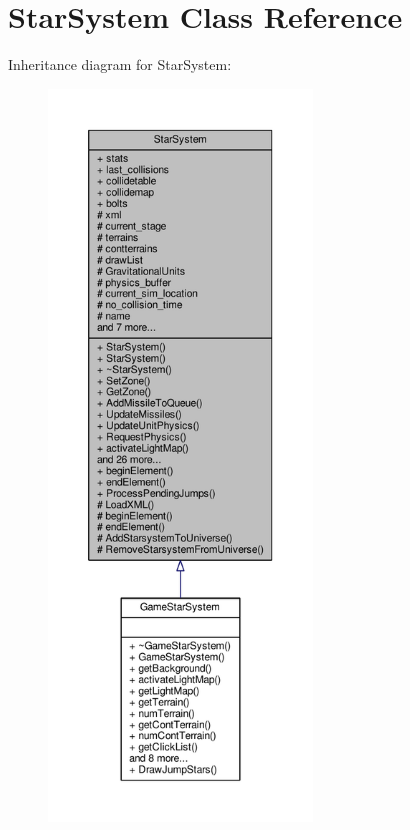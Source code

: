 \hypertarget{classStarSystem}{}\section{Star\+System Class Reference}
\label{classStarSystem}


Inheritance diagram for Star\+System\+:
\nopagebreak
\begin{figure}[H]
\begin{center}
\leavevmode
\includegraphics[height=550pt]{d5/dd4/classStarSystem__inherit__graph}
\end{center}
\end{figure}


